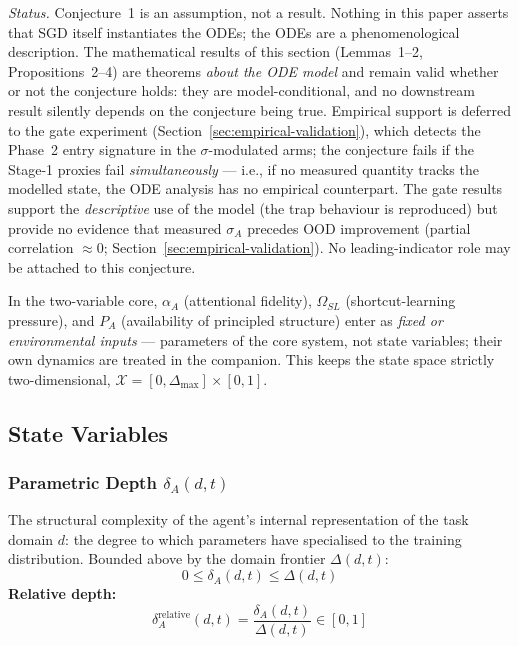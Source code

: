 \documentclass{article}
\theoremstyle{definition}
\begin{document}
\noindent\emph{Status.} Conjecture~1 is an assumption, not a result.
Nothing in this paper asserts that SGD itself instantiates the ODEs; the
ODEs are a phenomenological description. The mathematical results of
this section (Lemmas~1--2, Propositions~2--4) are theorems \emph{about
the ODE model} and remain valid whether or not the conjecture holds:
they are model-conditional, and no downstream result silently depends on
the conjecture being true. Empirical support is deferred to the gate
experiment (Section~\ref{sec:empirical-validation}), which detects the
Phase~2 entry signature in the $\sigma$-modulated arms; the conjecture
fails if the Stage-1 proxies fail \emph{simultaneously} --- i.e., if no
measured quantity tracks the modelled state, the ODE analysis has no
empirical counterpart. The gate results support the \emph{descriptive}
use of the model (the trap behaviour is reproduced) but provide no
evidence that measured $\sigma_A$ precedes OOD improvement (partial
correlation $\approx 0$; Section~\ref{sec:empirical-validation}). No
leading-indicator role may be attached to this conjecture.

\noindent In the two-variable core, $\alpha_A$ (attentional fidelity),
$\Omega_{SL}$ (shortcut-learning pressure), and $P_A$ (availability of
principled structure) enter as \emph{fixed or environmental inputs} ---
parameters of the core system, not state variables; their own dynamics
are treated in the companion. This keeps the state space strictly
two-dimensional, $\mathcal{X} = [0, \Delta_{\max}] \times [0, 1]$.

\subsection{State Variables}\label{sec:state-variables}

\subsubsection{Parametric Depth \texorpdfstring{$\delta_A(d,t)$}{delta\_A(d,t)}}\label{sec:depth}

The structural complexity of the agent's internal representation of the
task domain $d$: the degree to which parameters have specialised to the
training distribution. Bounded above by the domain frontier
$\Delta(d,t)$:
\begin{equation}\label{eq:depth-bounds}
0 \leq \delta_A(d,t) \leq \Delta(d,t)
\end{equation}
\textbf{Relative depth:}
\begin{equation}\label{eq:relative-depth}
\delta_A^{\text{relative}}(d,t) = \frac{\delta_A(d,t)}{\Delta(d,t)} \in [0,1]
\end{equation}
\end{document}
